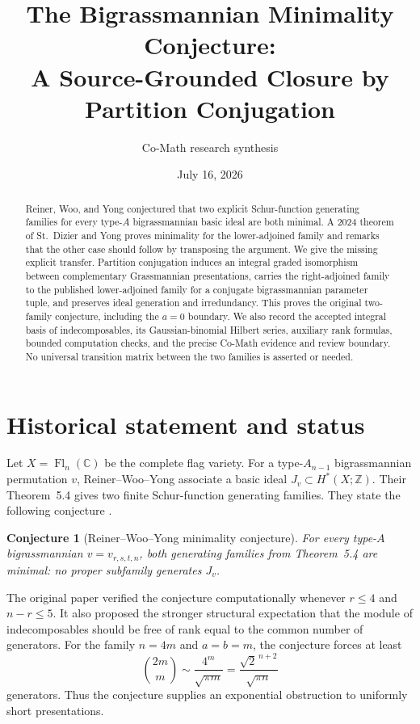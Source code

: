 \documentclass[11pt]{amsart}
\title{The Bigrassmannian Minimality Conjecture:\\
A Source-Grounded Closure by Partition Conjugation}
\author{Co-Math research synthesis}
\date{July 16, 2026}
\newtheorem{conjecture}[theorem]{Conjecture}
\theoremstyle{definition}
\theoremstyle{remark}
\newcommand{\Z}{\mathbb Z}
\begin{document}
\begin{abstract}
Reiner, Woo, and Yong conjectured that two explicit Schur-function generating
families for every type-$A$ bigrassmannian basic ideal are both minimal.  A
2024 theorem of St.~Dizier and Yong proves minimality for the lower-adjoined
family and remarks that the other case should follow by transposing the
argument.  We give the missing explicit transfer.  Partition conjugation
induces an integral graded isomorphism between complementary Grassmannian
presentations, carries the right-adjoined family to the published
lower-adjoined family for a conjugate bigrassmannian parameter tuple, and
preserves ideal generation and irredundancy.  This proves the original
two-family conjecture, including the $a=0$ boundary.  We also record the
accepted integral basis of indecomposables, its Gaussian-binomial Hilbert
series, auxiliary rank formulas, bounded computation checks, and the precise
Co-Math evidence and review boundary.  No universal transition matrix between
the two families is asserted or needed.
\end{abstract}

\maketitle
\tableofcontents

\section{Historical statement and status}

Let $X=\operatorname{Fl}_n(\mathbb C)$ be the complete flag variety.  For a
type-$A_{n-1}$ bigrassmannian permutation $v$, Reiner--Woo--Yong associate a
basic ideal $J_v\subset H^*(X;\Z)$.  Their Theorem~5.4 gives two finite
Schur-function generating families.  They state the following conjecture
\cite{RWY}.

\begin{conjecture}[Reiner--Woo--Yong minimality conjecture]
For every type-$A$ bigrassmannian $v=v_{r,s,t,n}$, both generating families
from Theorem~5.4 are minimal: no proper subfamily generates $J_v$.
\end{conjecture}

The original paper verified the conjecture computationally whenever
$r\leq4$ and $n-r\leq5$.  It also proposed the stronger structural
expectation that the module of indecomposables should be free of rank equal to
the common number of generators.  For the family $n=4m$ and $a=b=m$, the
conjecture forces at least
\[
  \binom{2m}{m}
  \sim \frac{4^m}{\sqrt{\pi m}}
  =\frac{\sqrt{2}^{\,n+2}}{\sqrt{\pi n}}
\]
generators.  Thus the conjecture supplies an exponential obstruction to
uniformly short presentations.
\end{document}
